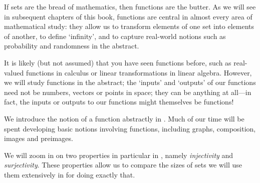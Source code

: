 If sets are the bread of mathematics, then functions are the butter. As we will see in subsequent chapters of this book, functions are central in almost every area of mathematical study: they allow us to transform elements of one set into elements of another, to define `infinity', and to capture real-world notions such as probability and randomness in the abstract.

It is likely (but not assumed) that you have seen functions before, such as real-valued functions in calculus or linear transformations in linear algebra. However, we will study functions in the abstract; the `inputs' and `outputs' of our functions need not be numbers, vectors or points in space; they can be anything at all---in fact, the inputs or outputs to our functions might themselves be functions!

We introduce the notion of a function abstractly in . Much of our time will be spent developing basic notions involving functions, including graphs, composition, images and preimages.

We will zoom in on two properties in particular in , namely \textit{injectivity} and \textit{surjectivity}. These properties allow us to compare the sizes of sets we will use them extensively in  for doing exactly that.
